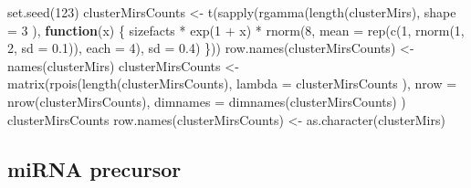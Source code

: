 \documentclass[12pt,twoside]{reedthesis}
\newenvironment{Shaded}{\begin{snugshade}}{\end{snugshade}}
\newcommand{\AttributeTok}[1]{\textcolor[rgb]{0.77,0.63,0.00}{#1}}
\newcommand{\ControlFlowTok}[1]{\textcolor[rgb]{0.13,0.29,0.53}{\textbf{#1}}}
\newcommand{\DecValTok}[1]{\textcolor[rgb]{0.00,0.00,0.81}{#1}}
\newcommand{\FloatTok}[1]{\textcolor[rgb]{0.00,0.00,0.81}{#1}}
\newcommand{\FunctionTok}[1]{\textcolor[rgb]{0.00,0.00,0.00}{#1}}
\newcommand{\NormalTok}[1]{#1}
\newcommand{\OtherTok}[1]{\textcolor[rgb]{0.56,0.35,0.01}{#1}}
\newcommand{\SpecialCharTok}[1]{\textcolor[rgb]{0.00,0.00,0.00}{#1}}
\begin{document}
\begin{Shaded}
\begin{Highlighting}[]
\FunctionTok{set.seed}\NormalTok{(}\DecValTok{123}\NormalTok{)}
\NormalTok{clusterMirsCounts }\OtherTok{\textless{}{-}} \FunctionTok{t}\NormalTok{(}\FunctionTok{sapply}\NormalTok{(}\FunctionTok{rgamma}\NormalTok{(}\FunctionTok{length}\NormalTok{(clusterMirs),}
  \AttributeTok{shape =} \DecValTok{3}
\NormalTok{), }\ControlFlowTok{function}\NormalTok{(x) \{}
\NormalTok{  sizefacts }\SpecialCharTok{*}
    \FunctionTok{exp}\NormalTok{(}\DecValTok{1} \SpecialCharTok{+}\NormalTok{ x) }\SpecialCharTok{*}
    \FunctionTok{rnorm}\NormalTok{(}\DecValTok{8}\NormalTok{, }\AttributeTok{mean =} \FunctionTok{rep}\NormalTok{(}\FunctionTok{c}\NormalTok{(}\DecValTok{1}\NormalTok{, }\FunctionTok{rnorm}\NormalTok{(}\DecValTok{1}\NormalTok{, }\DecValTok{2}\NormalTok{, }\AttributeTok{sd =} \FloatTok{0.1}\NormalTok{)), }\AttributeTok{each =} \DecValTok{4}\NormalTok{), }\AttributeTok{sd =} \FloatTok{0.4}\NormalTok{)}
\NormalTok{\}))}
\FunctionTok{row.names}\NormalTok{(clusterMirsCounts) }\OtherTok{\textless{}{-}} \FunctionTok{names}\NormalTok{(clusterMirs)}
\NormalTok{clusterMirsCounts }\OtherTok{\textless{}{-}} \FunctionTok{matrix}\NormalTok{(}\FunctionTok{rpois}\NormalTok{(}\FunctionTok{length}\NormalTok{(clusterMirsCounts),}
  \AttributeTok{lambda =}\NormalTok{ clusterMirsCounts}
\NormalTok{),}
\AttributeTok{nrow =} \FunctionTok{nrow}\NormalTok{(clusterMirsCounts), }\AttributeTok{dimnames =} \FunctionTok{dimnames}\NormalTok{(clusterMirsCounts)}
\NormalTok{)}
\NormalTok{clusterMirsCounts}
\FunctionTok{row.names}\NormalTok{(clusterMirsCounts) }\OtherTok{\textless{}{-}} \FunctionTok{as.character}\NormalTok{(clusterMirs)}
\end{Highlighting}
\end{Shaded}
\hypertarget{mirna-precursor}{%
\subsection*{miRNA precursor}\label{mirna-precursor}}
\end{document}
